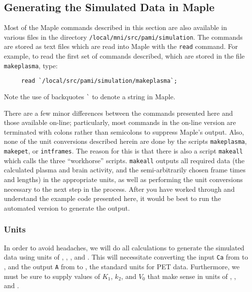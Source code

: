 \subsection{Generating the Simulated Data in Maple}

Most of the Maple commands described in this section are also
available in various files in the directory
\verb|/local/mni/src/pami/simulation|.  The commands are stored as text files which are read into
Maple with the \verb|read| command.  For example, to read the first
set of commands described, which are stored in the file
\verb|makeplasma|, type:
\begin{verbatim}
     read `/local/src/pami/simulation/makeplasma`;
\end{verbatim}
Note the use of backquotes \verb|`| to denote a string in Maple.

There are a few minor differences between the commands presented here
and those available on-line; particularly, most commands in the
on-line version are terminated with colons rather than semicolons to
suppress Maple's output.  Also, none of the unit conversions described
herein are done by the scripts \verb|makeplasma|, \verb|makepet|, or
\verb|intframes|.  The reason for this is that there is also a script 
\verb|makeall| which calls the three ``workhorse'' scripts.  
\verb|makeall| outputs all required data (the calculated plasma 
and brain activity, and the semi-arbitrarily chosen frame times and
lengths) in the appropriate units, as well as performing the unit
conversions necessary to the next step in the process.  After you have
worked through and understand the example code presented here, it
would be best to run the automated version to generate the output.

\subsubsection{Units}

In order to avoid headaches, we will do all calculations to generate
the simulated data using units of , ,
, and .  This will necessitate converting
the input \verb|Ca| from  to
, and the output \verb|A| from
 to
, the standard units for PET data.
Furthermore, we must be sure to supply values of $K_{1}$, $k_{2}$, and
$V_{0}$ that make sense in units of
, , and
.


